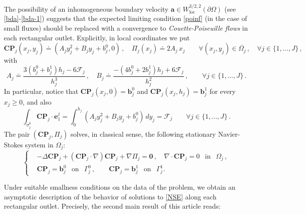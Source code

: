 \documentclass[11pt]{article}
\numberwithin{equation}{section}
\numberwithin{figure}{section}
\def\loc{{\mathrm{loc}}}
\def\0{{\mathbf 0}}
\def\be{{\mathbf b}}
\def\ee{{\mathbf e}}
\def\ae{{\mathbf a}}
\begin{document}
The possibility of an inhomogeneous boundary velocity $\ae\in W^{3/2,2}_\loc(\partial\Omega)$ (see \eqref{bda}-\eqref{bda-1})
suggests that the expected limiting condition \eqref{poinf} (in the case of small fluxes) should be replaced with a convergence to
\textit{Couette-Poiseuille flows} in each rectangular outlet. Explicitly, in local coordinates we put
\begin{equation} \label{CP}
\mathbf{CP}_j(x_{j},y_{j})\doteq(A_jy_j^2+B_jy_j+b_j^0,0)\, ,\quad\Pi_{j}(x_{j}) \doteq2A_j\, x_{j}\qquad\forall(x_j,y_j)\in\overline{\Omega_{j}}\, ,
\quad\forall j \in \{1,\dots,J \} \, ,
\end{equation}
with
\begin{equation} \label{CPconstants}
A_j \doteq  \frac{3(b^0_j+b^1_j)h_j - 6 \mathcal{F}_j}{h_j^3} \, , \quad B_j \doteq \frac{-(4b_j^0+2b_j^1)h_j + 6 \mathcal{F}_j}{h_j^2} \, , \qquad \forall j \in \{1,\dots,J \} \, .
\end{equation}
In particular, notice that $\mathbf{CP}_j(x_{j},0) = \be_j^0$ and $\mathbf{CP}_j(x_{j}, h_{j}) = \be_j^1$ for every $x_{j} \geq 0$, and also
\begin{equation}  \label{fluxcp0}
\int_{\sigma_j^0} \mathbf{CP}_j \cdot \ee_1^j = \int_{0}^{h_{j}} (A_j y_j^2 + B_j y_j + b_j^0) \, dy_{j} = \mathcal{F}_j \qquad \forall j \in \{1,\dots,J \} \, .
\end{equation}
The pair $(\mathbf{CP}_{j},\Pi_{j})$ solves, in classical sense, the following stationary Navier-Stokes system in $\Omega_{j}$:
\begin{equation} \label{nscouette}
	\left\{
	\begin{aligned}
		&- \Delta \mathbf{CP}_{j} + (\mathbf{CP}_{j} \cdot \nabla) \mathbf{CP}_{j} + \nabla \Pi_{j}= \0 \, , \quad \nabla \cdot \mathbf{CP}_{j} = 0 \ \ \mbox{ in } \ \ \Omega_{j} \, , \\[4pt]
		& \mathbf{CP}_{j} = \be_j^0 \ \ \mbox{ on } \ \ \Gamma_{j}^{0} \, , \qquad \mathbf{CP}_{j} = \be_j^1 \ \ \mbox{ on } \ \ \Gamma_{j}^{1}.
	\end{aligned}
	\right.
\end{equation}


Under suitable smallness conditions on the data of the problem, we obtain an asymptotic description of the behavior of solutions to
\eqref{NSE} along each rectangular outlet. Precisely, the second main result of this article reads:
\end{document}
